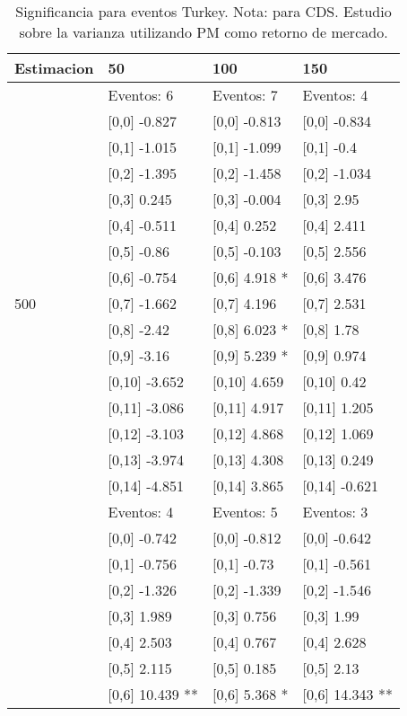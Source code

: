 \begin{table}

\caption{Significancia para eventos Turkey. Nota: para CDS. Estudio sobre la varianza utilizando PM como retorno de mercado.}
\centering
\begin{tabular}[t]{llll}
\toprule
Estimacion & 50 & 100 & 150\\
\midrule
 & Eventos:  6 & Eventos:  7 & Eventos:  4\\
 & {}[0,0] -0.827 & {}[0,0] -0.813 & {}[0,0] -0.834\\
 & {}[0,1] -1.015 & {}[0,1] -1.099 & {}[0,1] -0.4\\
 & {}[0,2] -1.395 & {}[0,2] -1.458 & {}[0,2] -1.034\\
 & {}[0,3] 0.245 & {}[0,3] -0.004 & {}[0,3] 2.95\\
\addlinespace
 & {}[0,4] -0.511 & {}[0,4] 0.252 & {}[0,4] 2.411\\
 & {}[0,5] -0.86 & {}[0,5] -0.103 & {}[0,5] 2.556\\
 & {}[0,6] -0.754 & {}[0,6] 4.918 * & {}[0,6] 3.476\\
500 & {}[0,7] -1.662 & {}[0,7] 4.196 & {}[0,7] 2.531\\
 & {}[0,8] -2.42 & {}[0,8] 6.023 * & {}[0,8] 1.78\\
\addlinespace
 & {}[0,9] -3.16 & {}[0,9] 5.239 * & {}[0,9] 0.974\\
 & {}[0,10] -3.652 & {}[0,10] 4.659 & {}[0,10] 0.42\\
 & {}[0,11] -3.086 & {}[0,11] 4.917 & {}[0,11] 1.205\\
 & {}[0,12] -3.103 & {}[0,12] 4.868 & {}[0,12] 1.069\\
 & {}[0,13] -3.974 & {}[0,13] 4.308 & {}[0,13] 0.249\\
\addlinespace
 & {}[0,14] -4.851 & {}[0,14] 3.865 & {}[0,14] -0.621\\
 & Eventos:  4 & Eventos:  5 & Eventos:  3\\
 & {}[0,0] -0.742 & {}[0,0] -0.812 & {}[0,0] -0.642\\
 & {}[0,1] -0.756 & {}[0,1] -0.73 & {}[0,1] -0.561\\
 & {}[0,2] -1.326 & {}[0,2] -1.339 & {}[0,2] -1.546\\
\addlinespace
 & {}[0,3] 1.989 & {}[0,3] 0.756 & {}[0,3] 1.99\\
 & {}[0,4] 2.503 & {}[0,4] 0.767 & {}[0,4] 2.628\\
 & {}[0,5] 2.115 & {}[0,5] 0.185 & {}[0,5] 2.13\\
 & {}[0,6] 10.439 ** & {}[0,6] 5.368 * & {}[0,6] 14.343 **\\

\end{tabular}
\end{table}
